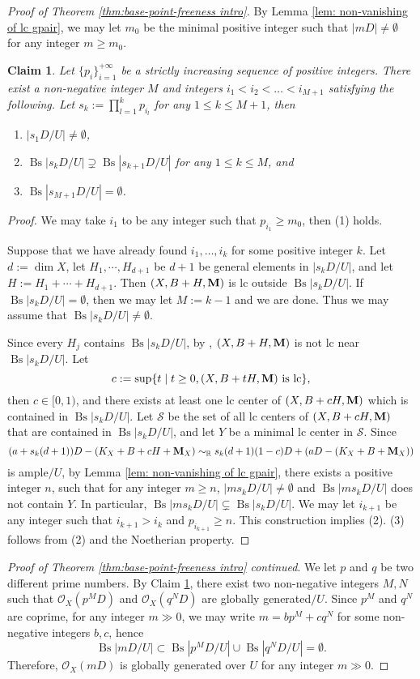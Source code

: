 \documentclass[11pt]{amsart}
\numberwithin{equation}{section}
\newcommand{\Mm}{{\bf{M}}}
\newcommand{\Bs}{{\operatorname{Bs}}}
\newtheorem{claim}[thm]{Claim}
\theoremstyle{definition}
\theoremstyle{definition}
\theoremstyle{definition}
\begin{document}
\begin{proof}[Proof of Theorem \ref{thm:base-point-freeness intro}]
By Lemma \ref{lem: non-vanishing of lc gpair}, we may let $m_0$ be the minimal positive integer such that $|mD|\not=\emptyset$ for any integer $m\geq m_0$.

\begin{claim}\label{claim: induction bs}
Let $\{p_i\}_{i=1}^{+\infty}$ be a strictly increasing sequence of positive integers. There exist a non-negative integer $M$ and integers $i_1<i_2<\dots<i_{M+1}$ satisfying the following. Let $s_k:=\prod_{l=1}^kp_{i_l}$ for any $1\leq k\leq M+1$, then
\begin{enumerate}
    \item $|s_1D/U|\not=\emptyset$,
    \item $\Bs|s_kD/U|\supsetneq\Bs|s_{k+1}D/U|$ for any $1\leq k\leq M$, and
    \item $\Bs|s_{M+1}D/U|=\emptyset$.
\end{enumerate}
\end{claim}
\begin{proof}
We may take $i_1$ to be any integer such that $p_{i_1}\geq m_0$, then (1) holds. 

Suppose that we have already found $i_1,\dots,i_k$ for some positive integer $k$. Let $d:=\dim X$, let $H_{1},\cdots,H_{d+1}$ be $d+1$ be general elements in $|s_kD/U|$, and let $H:=H_{1}+\cdots+H_{d+1}$. Then $(X,B+H,\Mm)$ is lc outside $\Bs|s_kD/U|$. If $\Bs|s_kD/U|=\emptyset$, then we may let $M:=k-1$ and we are done. Thus we may assume that $\Bs|s_kD/U|\not=\emptyset$.

Since every $H_{j}$ contains $\Bs|s_kD/U|$, by \cite[Theorem 18.22]{Kol+92}, $(X,B+H,\Mm)$ is not lc near $\Bs|s_kD/U|$. Let 
$$c:=\sup\{t\mid t\geq 0, (X,B+tH,\Mm)\text{ is lc}\},$$
then $c\in [0,1)$, and there exists at least one lc center of $(X,B+cH,\Mm)$ which is contained in $\Bs|s_kD/U|$. Let
$\mathcal{S}$ be the set of all lc centers of $(X,B+cH,\Mm)$ that are contained in $\Bs|s_kD/U|$, and let $Y$ be a minimal lc center in $\mathcal{S}$. Since
$$(a+s_k(d+1))D-(K_X+B+cH+\Mm_X)\sim_{\mathbb R}s_k(d+1)(1-c)D+(aD-(K_X+B+\Mm_X))$$
is ample$/U$, by Lemma \ref{lem: non-vanishing of lc gpair}, there exists a positive integer $n$, such that for any integer $m\geq n$, $|ms_kD/U|\not=\emptyset$ and $\Bs|ms_kD/U|$ does not contain $Y$. In particular, $\Bs|ms_kD/U|\subsetneq\Bs|s_kD/U|$. We may let $i_{k+1}$ be any integer such that $i_{k+1}>i_{k}$ and $p_{i_{k+1}}\geq n$. This construction implies (2). (3) follows from (2) and the Noetherian property.
\end{proof}

\noindent\textit{Proof of Theorem \ref{thm:base-point-freeness intro} continued}. We let $p$ and $q$ be two different prime numbers. By Claim \ref{claim: induction bs}, there exist two non-negative integers $M,N$ such that $\mathcal{O}_X(p^MD)$ and $\mathcal{O}_X(q^ND)$ are globally generated$/U$. Since $p^M$ and $q^N$ are coprime, for any integer $m\gg 0$, we may write $m=bp^M+cq^N$ for some non-negative integers $b,c$, hence
$$\Bs|mD/U|\subset\Bs|p^MD/U|\cup\Bs|q^ND/U|=\emptyset.$$
Therefore, $\mathcal{O}_X(mD)$ is globally generated over $U$ for any integer $m\gg 0$.
\end{proof}
\end{document}
